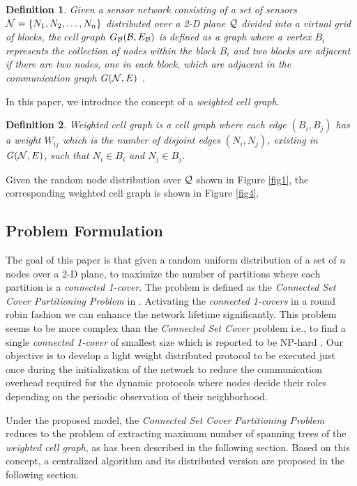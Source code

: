 \documentclass{acm_proc_article-sp}
\newtheorem{definition}{Definition}
\begin{document}
\vspace{-0.7cm}
 \begin{definition}Given a sensor network consisting of a set of sensors ${\cal N}=\{ N_1, N_2, \ldots, N_n\}$ distributed over a 2-D plane ${\cal Q }$ divided into a virtual grid of blocks, the $cell\ graph$ $G_{\cal B}({\cal B}, E_{\cal B})$ is defined as a graph where a vertex ${B_i}$ represents the collection of nodes within the block $B_i$ and two blocks are adjacent if there are two nodes, one in each block, which are adjacent in the communication graph ${{\it G}}({\cal N}, E)$ \cite{Arvind}.
 \end{definition}
  \vspace{-0.45cm}
 In this paper, we introduce the concept of a {\it weighted cell graph}.
  \vspace{-0.4cm}
 \begin{definition}
  Weighted cell graph is a cell graph where each edge $(B_i, B_j)$ has a weight $W_{ij}$ which is the number of disjoint edges $(N_i, N_j)$, existing in ${{\it G}}({\cal N},E)$, such that $N_i \in B_i$ and $N_j \in B_j$. 
 \end{definition}
\vspace{-0.5cm}
Given the random node distribution over ${\cal Q }$ shown in Figure \ref{fig1}, the corresponding weighted cell graph is shown in Figure \ref{fig4}.
\subsection{Problem Formulation} 
The goal of this paper is that given a random uniform distribution of a set of $n$ nodes over a 2-D plane, to maximize the number of partitions where each partition is a {\it connected 1-cover}. The problem is defined as the {\it Connected Set Cover Partitioning Problem} in \cite{Pervin}. Activating the {\it connected 1-covers} in a round robin fashion we can enhance the network lifetime significantly. This problem seems to be more complex than the {\it Connected Set Cover} problem i.e., to find a single {\it connected 1-cover} of smallest size which is reported to be NP-hard \cite{SSlij}. Our objective is to develop a light weight distributed protocol to be executed just once during the initialization of the network to reduce the communication overhead required for the dynamic protocols where nodes decide their roles depending on the periodic observation of their neighborhood.

Under the proposed model, the {\it Connected Set Cover Partitioning Problem} reduces to the problem of extracting maximum number of spanning trees of the {\it weighted cell graph}, as has been described in the following section. Based on this concept, a centralized algorithm and its distributed version are proposed in the following section. 
\end{document}
